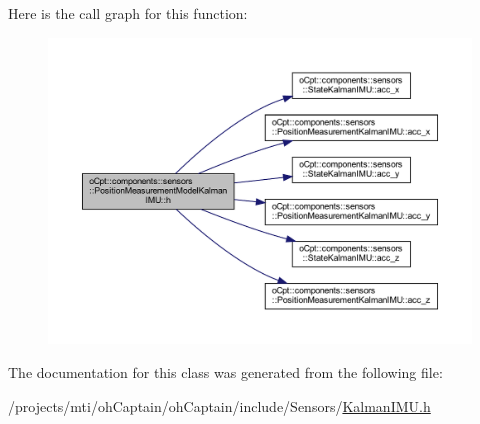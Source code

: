 Here is the call graph for this function\+:
\nopagebreak
\begin{figure}[H]
\begin{center}
\leavevmode
\includegraphics[width=350pt]{classo_cpt_1_1components_1_1sensors_1_1_position_measurement_model_kalman_i_m_u_a2cc7f4c711ed5db5d24bd8c936c3195e_cgraph}
\end{center}
\end{figure}


The documentation for this class was generated from the following file\+:\begin{DoxyCompactItemize}
\item 
/projects/mti/oh\+Captain/oh\+Captain/include/\+Sensors/\hyperlink{_kalman_i_m_u_8h}{Kalman\+I\+M\+U.\+h}\end{DoxyCompactItemize}
